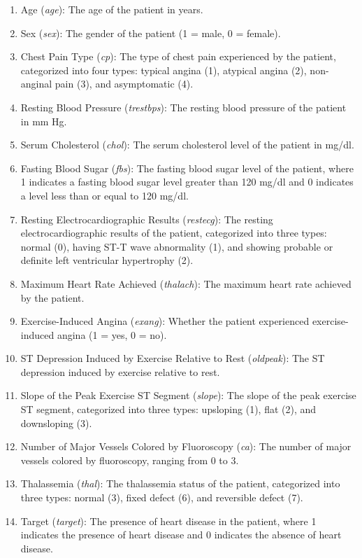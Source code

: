\begin{enumerate}
    \item Age (\textit{age}): The age of the patient in years.
    \item Sex (\textit{sex}): The gender of the patient (1 = male, 0 = female).
    \item Chest Pain Type (\textit{cp}): The type of chest pain experienced by the patient, categorized into four types: typical angina (1), atypical angina (2), non-anginal pain (3), and asymptomatic (4).
    \item Resting Blood Pressure (\textit{trestbps}): The resting blood pressure of the patient in mm Hg.
    \item Serum Cholesterol (\textit{chol}): The serum cholesterol level of the patient in mg/dl.
    \item Fasting Blood Sugar (\textit{fbs}): The fasting blood sugar level of the patient, where 1 indicates a fasting blood sugar level greater than 120 mg/dl and 0 indicates a level less than or equal to 120 mg/dl.
    \item Resting Electrocardiographic Results (\textit{restecg}): The resting electrocardiographic results of the patient, categorized into three types: normal (0), having ST-T wave abnormality (1), and showing probable or definite left ventricular hypertrophy (2).
    \item Maximum Heart Rate Achieved (\textit{thalach}): The maximum heart rate achieved by the patient.
    \item Exercise-Induced Angina (\textit{exang}): Whether the patient experienced exercise-induced angina (1 = yes, 0 = no).
    \item ST Depression Induced by Exercise Relative to Rest (\textit{oldpeak}): The ST depression induced by exercise relative to rest.
    \item Slope of the Peak Exercise ST Segment (\textit{slope}): The slope of the peak exercise ST segment, categorized into three types: upsloping (1), flat (2), and downsloping (3).
    \item Number of Major Vessels Colored by Fluoroscopy (\textit{ca}): The number of major vessels colored by fluoroscopy, ranging from 0 to 3.
    \item Thalassemia (\textit{thal}): The thalassemia status of the patient, categorized into three types: normal (3), fixed defect (6), and reversible defect (7).
    \item Target (\textit{target}): The presence of heart disease in the patient, where 1 indicates the presence of heart disease and 0 indicates the absence of heart disease.
\end{enumerate}



